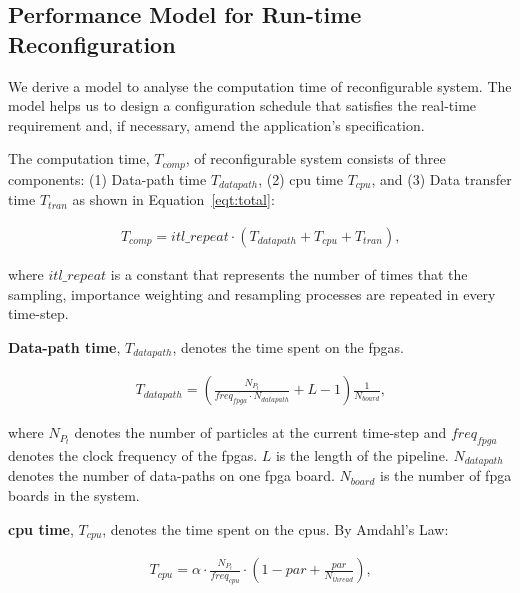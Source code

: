 \subsection{Performance Model for Run-time Reconfiguration}
\label{sec:reconfig_reconfig}

We derive a model to analyse the computation time of reconfigurable system.
The model helps us to design a configuration schedule that satisfies the real-time requirement and, if necessary, amend the application's specification.

The computation time, $T_{comp}$, of reconfigurable system consists of three components: (1) Data-path time $T_{datapath}$, (2) \gls{cpu} time $T_{cpu}$, and (3) Data transfer time $T_{tran}$ as shown in Equation~\ref{eqt:total}:

\begin{equation}
\begin{aligned}
T_{comp} = itl\_repeat \cdot \left ( T_{datapath} + T_{cpu} + T_{tran} \right ) \mbox{,}
\end{aligned}
\label{eqt:total}
\end{equation}

where $itl\_repeat$ is a constant that represents the number of times that the sampling, importance weighting and resampling processes are repeated in every time-step.

\textbf{Data-path time}, $T_{datapath}$, denotes the time spent on the \glspl{fpga}.

\begin{equation}
\begin{aligned}
T_{datapath} = \left(\frac{{N_{P_t}}}{freq_{fpga} \cdot N_{datapath}} + L - 1 \right) \frac{1}{N_{board}} \mbox{,}
\end{aligned}
\label{eqt:kernel}
\end{equation}

where $N_{P_t}$ denotes the number of particles at the current time-step and $freq_{fpga}$ denotes the clock frequency of the \glspl{fpga}.
$L$ is the length of the pipeline.
$N_{datapath}$ denotes the number of data-paths on one \gls{fpga} board.
$N_{board}$ is the number of \gls{fpga} boards in the system.

\textbf{\gls{cpu} time}, $T_{cpu}$, denotes the time spent on the \glspl{cpu}.
By Amdahl's Law:

\begin{equation}
\begin{aligned}
T_{cpu} = \alpha \cdot \frac{{N_{P_t}}}{freq_{cpu}} \cdot \left(1-par+\frac{par}{N_{thread}}\right) \mbox{,}
\end{aligned}
\label{eqt:host}
\end{equation}

